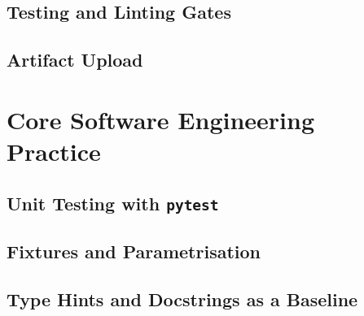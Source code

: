 \subsection{Testing and Linting Gates}


\subsection{Artifact Upload}

\section{Core Software Engineering Practice}
\label{sec:software-engineering}

\subsection{Unit Testing with \texttt{pytest}}

\subsection{Fixtures and Parametrisation}

\subsection{Type Hints and Docstrings as a Baseline}
